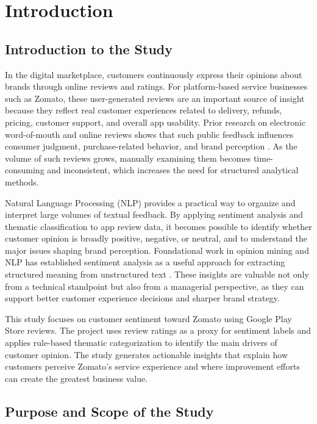 \chapter{Introduction}

\section{Introduction to the Study}

In the digital marketplace, customers continuously express their opinions about brands through online reviews and ratings. For platform-based service businesses such as Zomato, these user-generated reviews are an important source of insight because they reflect real customer experiences related to delivery, refunds, pricing, customer support, and overall app usability. Prior research on electronic word-of-mouth and online reviews shows that such public feedback influences consumer judgment, purchase-related behavior, and brand perception \cite{chevalier2006,filieri2015,park2009}. As the volume of such reviews grows, manually examining them becomes time-consuming and inconsistent, which increases the need for structured analytical methods.

Natural Language Processing (NLP) provides a practical way to organize and interpret large volumes of textual feedback. By applying sentiment analysis and thematic classification to app review data, it becomes possible to identify whether customer opinion is broadly positive, negative, or neutral, and to understand the major issues shaping brand perception. Foundational work in opinion mining and NLP has established sentiment analysis as a useful approach for extracting structured meaning from unstructured text \cite{pang2008,liu2012,manning1999,jurafsky2024}. These insights are valuable not only from a technical standpoint but also from a managerial perspective, as they can support better customer experience decisions and sharper brand strategy.

This study focuses on customer sentiment toward Zomato using Google Play Store reviews. The project uses review ratings as a proxy for sentiment labels and applies rule-based thematic categorization to identify the main drivers of customer opinion. The study generates actionable insights that explain how customers perceive Zomato's service experience and where improvement efforts can create the greatest business value.

\section{Purpose and Scope of the Study}

